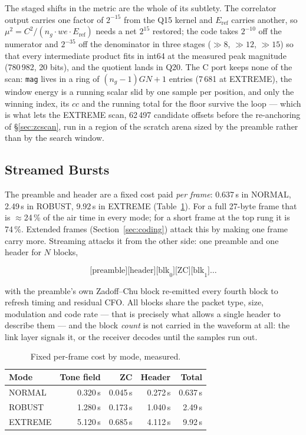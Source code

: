 The staged shifts in the metric are the whole of its subtlety.  The
correlator output carries one factor of $2^{-15}$ from the Q15 kernel
and $E_{\mathrm{ref}}$ carries another, so $\mu^2 = C^2 / (n_g \cdot
we \cdot E_{\mathrm{ref}})$ needs a net $2^{15}$ restored; the code
takes $2^{-10}$ off the numerator and $2^{-35}$ off the denominator in
three stages ($\gg 8$, $\gg 12$, $\gg 15$) so that every intermediate
product fits in int64 at the measured peak magnitude (780\,982, 20
bits), and the quotient lands in Q20.  The C port keeps none of the
scan: \texttt{mag} lives in a ring of $(n_g - 1)GN + 1$ entries
(7\,681 at EXTREME), the window energy is a running scalar slid by one
sample per position, and only the winning index, its $cc$ and the
running total for the floor survive the loop --- which is what lets the
EXTREME scan, 62\,497 candidate offsets before the re-anchoring of
\S\ref{sec:zcscan}, run in a region of the scratch arena sized by the preamble rather
than by the search window.

\subsection{Streamed Bursts}
\label{sec:stream}

The preamble and header are a fixed cost paid \emph{per frame}:
0.637\,s in NORMAL, 2.49\,s in ROBUST, 9.92\,s in EXTREME
(Table~\ref{tab:fixed_cost}).  For a full 27-byte frame that is
$\approx$24\,\% of the air time in every mode; for a short frame at the
top rung it is 74\,\%.  Extended frames (Section~\ref{sec:coding})
attack this by making one frame carry more.  Streaming attacks it from
the other side: one preamble and one header for $N$ blocks,

\[
\text{[preamble][header][blk}_0\text{][ZC][blk}_1\text{]}\dots
\]

with the preamble's own Zadoff--Chu block re-emitted every fourth block
to refresh timing and residual CFO.  All blocks share the packet type,
size, modulation and code rate --- that is precisely what allows a
single header to describe them --- and the block \emph{count} is not
carried in the waveform at all: the link layer signals it, or the
receiver decodes until the samples run out.

\begin{table}[H]
    \centering
    \caption{Fixed per-frame cost by mode, measured.}
    \label{tab:fixed_cost}
    \begin{tabular}{lrrrr}
        \toprule
        Mode & Tone field & ZC & Header & Total \\
        \midrule
        NORMAL  & 0.320\,s & 0.045\,s & 0.272\,s & 0.637\,s \\
        ROBUST  & 1.280\,s & 0.173\,s & 1.040\,s & 2.49\,s \\
        EXTREME & 5.120\,s & 0.685\,s & 4.112\,s & 9.92\,s \\
        \bottomrule
    \end{tabular}
\end{table}

